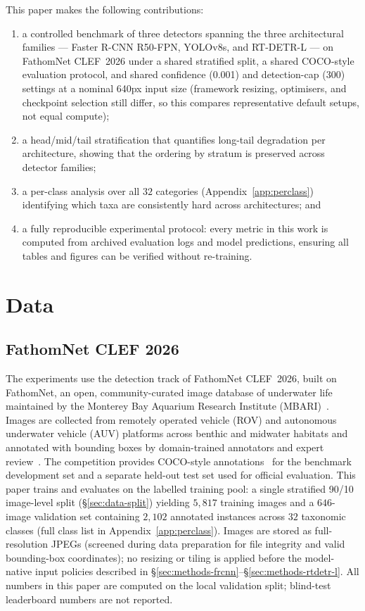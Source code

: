 \documentclass[11pt,a4paper,twocolumn]{article}
\begin{document}
This paper makes the following contributions:
\begin{enumerate}
  \item a controlled benchmark of three detectors spanning the three
        architectural families --- Faster R-CNN R50-FPN, YOLOv8s, and
        RT-DETR-L --- on FathomNet CLEF~2026 under a shared stratified
        split, a shared COCO-style evaluation protocol, and shared
        confidence (0.001) and detection-cap (300) settings at a nominal 640px input size (framework resizing, optimisers,
        and checkpoint selection still differ, so this compares representative default setups, not equal compute);
  \item a head/mid/tail stratification that quantifies long-tail
        degradation per architecture, showing that the ordering by stratum
        is preserved across detector families;
  \item a per-class analysis over all $32$ categories
        (Appendix~\ref{app:perclass}) identifying which taxa are
        consistently hard across architectures; and
  \item a fully reproducible experimental protocol: every metric in this work
        is computed from archived evaluation logs and model predictions,
        ensuring all tables and figures can be verified without re-training.
\end{enumerate}

\section{Data}
\label{sec:data}

\subsection{FathomNet CLEF 2026}
\label{sec:data-dataset}

The experiments use the detection track of FathomNet CLEF~2026,
built on FathomNet, an open, community-curated image database of
underwater life maintained by the Monterey Bay Aquarium Research
Institute (MBARI)~\cite{fathomnet2022}. Images are collected from
remotely operated vehicle (ROV) and autonomous underwater vehicle
(AUV) platforms across benthic and midwater habitats and annotated
with bounding boxes by domain-trained annotators and expert
review~\cite{fathomnet2022}. The competition provides COCO-style
annotations~\cite{coco2014} for the benchmark development set and a
separate held-out test set used for official evaluation. This paper trains and evaluates on the labelled training
pool: a single stratified 90/10 image-level split
(\S\ref{sec:data-split}) yielding $5{,}817$ training images and a
$646$-image validation set containing $2{,}102$ annotated instances
across $32$ taxonomic classes (full class list in
Appendix~\ref{app:perclass}). Images are stored as full-resolution
JPEGs (screened during data preparation for file integrity and
valid bounding-box coordinates); no resizing or tiling is applied
before the model-native input policies described in
\S\ref{sec:methods-frcnn}--\S\ref{sec:methods-rtdetr-l}.
All numbers in this paper are computed on the local validation split;
blind-test leaderboard numbers are not reported.
\end{document}
